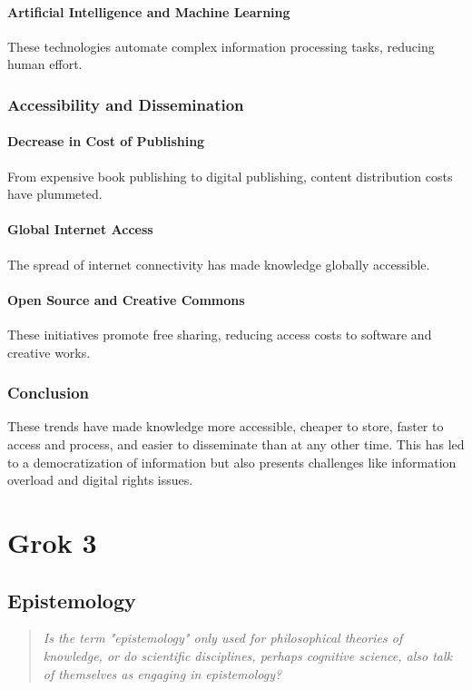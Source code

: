\documentclass[10pt,titlepage]{book}
\begin{document}
\subsection{Artificial Intelligence and Machine Learning}
These technologies automate complex information processing tasks, reducing human effort.

\section{Accessibility and Dissemination}

\subsection{Decrease in Cost of Publishing}
From expensive book publishing to digital publishing, content distribution costs have plummeted.

\subsection{Global Internet Access}
The spread of internet connectivity has made knowledge globally accessible.

\subsection{Open Source and Creative Commons}
These initiatives promote free sharing, reducing access costs to software and creative works.

\section{Conclusion}

These trends have made knowledge more accessible, cheaper to store, faster to access and process, and easier to disseminate than at any other time. This has led to a democratization of information but also presents challenges like information overload and digital rights issues.

\part{Grok 3}

\chapter{Epistemology}
\begin{quote}
  {\it Is the term "epistemology" only used for philosophical theories of knowledge, or do scientific disciplines, perhaps cognitive science, also talk of themselves as engaging in epistemology?}
\end{quote}
\end{document}
